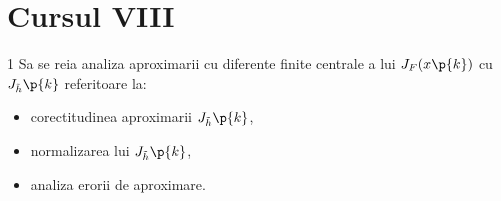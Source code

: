 
\section*{Cursul VIII}

\begin{exercitiu}{1}
    Sa se reia analiza aproximarii cu diferente finite centrale a lui $ J_F(x\p{k})$ cu $ J_{\tilde{h}}\p{k}$ referitoare la:
    \begin{itemize}
        \item[-] corectitudinea aproximarii $J_{\tilde{h}}\p{k}$, 
        \item[-] normalizarea lui $J_{\tilde{h}}\p{k}$,
        \item[-] analiza erorii de aproximare.
    \end{itemize}
\end{exercitiu}

